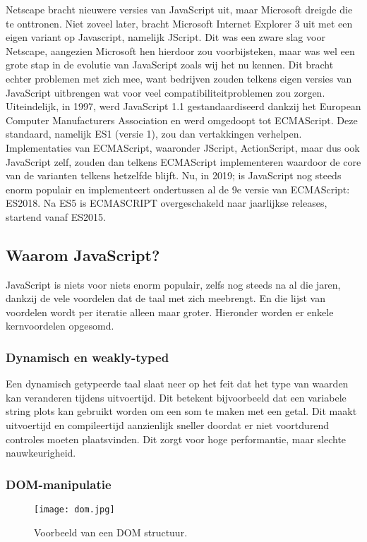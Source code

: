 Netscape bracht nieuwere versies van JavaScript uit, maar Microsoft dreigde die te onttronen. Niet zoveel later, bracht Microsoft Internet Explorer 3 uit met een eigen variant op Javascript, namelijk JScript. Dit was een zware slag voor Netscape, aangezien Microsoft hen hierdoor zou voorbijsteken, maar was wel een grote stap in de evolutie van JavaScript zoals wij het nu kennen. Dit bracht echter problemen met zich mee, want bedrijven zouden telkens eigen versies van JavaScript uitbrengen wat voor veel compatibiliteitproblemen zou zorgen. Uiteindelijk, in 1997, werd JavaScript 1.1 gestandaardiseerd dankzij het European Computer Manufacturers Association en werd omgedoopt tot ECMAScript. \autocite{Wiley2016} Deze standaard, namelijk ES1 (versie 1), zou dan vertakkingen verhelpen. Implementaties van ECMAScript, waaronder JScript, ActionScript, maar dus ook JavaScript zelf, zouden dan telkens ECMAScript implementeren waardoor de core van de varianten telkens hetzelfde blijft. Nu, in 2019; is JavaScript nog steeds enorm populair en implementeert ondertussen al de 9e versie van ECMAScript: ES2018. Na ES5 is ECMASCRIPT overgeschakeld naar jaarlijkse releases, startend vanaf ES2015.

\subsection{Waarom JavaScript?}
\label{sec:jsWhy}

JavaScript is niets voor niets enorm populair, zelfs nog steeds na al die jaren, dankzij de vele voordelen dat de taal met zich meebrengt. En die lijst van voordelen wordt per iteratie alleen maar groter. Hieronder worden er enkele kernvoordelen opgesomd.

\subsubsection{Dynamisch en weakly-typed}
\label{sec:dynamic}

Een dynamisch getypeerde taal slaat neer op het feit dat het type van waarden kan veranderen tijdens uitvoertijd. Dit betekent bijvoorbeeld dat een variabele string plots kan gebruikt worden om een som te maken met een getal. Dit maakt uitvoertijd en compileertijd aanzienlijk sneller doordat er niet voortdurend controles moeten plaatsvinden. Dit zorgt voor hoge performantie, maar slechte nauwkeurigheid.

\subsubsection{DOM-manipulatie}
\label{sec:DOM}
\begin{figure}
	\texttt{[image: dom.jpg]}
	\caption{Voorbeeld van een DOM structuur.}
	\label{fig:dom}
\end{figure}

